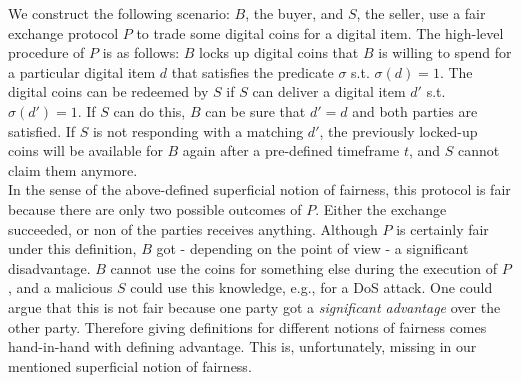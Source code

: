 \documentclass{cacthesis}
\newcounter{protocol}
\begin{document}
        We construct the following scenario: $B$, the buyer, and $S$, the seller, use a fair exchange protocol $P$ to trade some digital coins for a digital item. The high-level procedure of $P$ is as follows: $B$ locks up digital coins that $B$ is willing to spend for a particular digital item $d$ that satisfies the predicate $\sigma$ s.t. $\sigma\left( d\right) =1$. The digital coins can be redeemed by $S$ if $S$ can deliver a digital item $d'$ s.t. $\sigma\left( d'\right) =1$. If $S$ can do this, $B$ can be sure that $d' = d$ and both parties are satisfied. If $S$ is not responding with a matching $d'$, the previously locked-up coins will be available for $B$ again after a pre-defined timeframe $t$, and $S$ cannot claim them anymore. \\
        In the sense of the above-defined superficial notion of fairness, this protocol is fair because there are only two possible outcomes of $P$. Either the exchange succeeded, or non of the parties receives anything. 
        Although $P$ is certainly fair under this definition, $B$ got - depending on the point of view - a significant disadvantage. $B$ cannot use the coins for something else during the execution of $P$, and a malicious $S$ could use this knowledge, e.g., for a DoS attack. One could argue that this is not fair because one party got a \textit{significant advantage} over the other party. Therefore giving definitions for different notions of fairness comes hand-in-hand with defining advantage. This is, unfortunately, missing in our mentioned superficial notion of fairness. 
        
\end{document}
